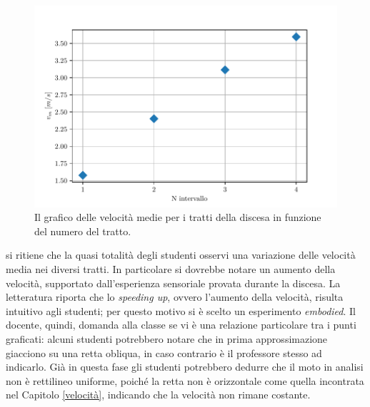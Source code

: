 \documentclass{report} \usepackage[T1]{fontenc} \usepackage[italian]{babel}
\begin{document}
\begin{figure}[H]
\centering
  \includegraphics[width=\textwidth]{v-N_tratto}
  \caption{Il grafico delle velocità medie per i tratti della
           discesa in funzione del numero del tratto.}
  \label{fig:v-N_tratto}
\end{figure}

si ritiene che la quasi totalità degli
studenti osservi una variazione delle velocità media nei diversi tratti. In
particolare si dovrebbe notare  un aumento della velocità, supportato
dall'esperienza sensoriale
provata durante la discesa. La letteratura
riporta che lo \emph{speeding up}, ovvero l'aumento della velocità,
risulta intuitivo agli studenti\cite{trowbridge1981investigation};
per questo motivo si è scelto un esperimento \emph{embodied}.
Il docente, quindi, domanda alla classe se vi è una
relazione particolare tra i punti graficati: alcuni studenti potrebbero notare
che in prima approssimazione giacciono su una retta obliqua,
in caso contrario è il professore stesso ad indicarlo.
Già in questa fase gli studenti potrebbero dedurre che il moto in analisi non è
rettilineo uniforme, poiché la retta non è orizzontale come quella incontrata
nel Capitolo \ref{velocità}, indicando che la velocità non rimane costante.
\end{document}

